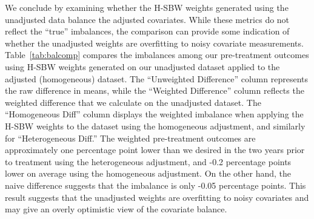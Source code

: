 We conclude by examining whether the H-SBW weights generated using the unadjusted data balance the adjusted covariates. While these metrics do not reflect the ``true'' imbalances, the comparison can provide some indication of whether the unadjusted weights are overfitting to noisy covariate measurements. Table~\ref{tab:balcomp} compares the imbalances among our pre-treatment outcomes using H-SBW weights generated on our unadjusted dataset applied to the adjusted (homogeneous) dataset. The ``Unweighted Difference'' column represents the raw difference in means, while the ``Weighted Difference'' column reflects the weighted difference that we calculate on the unadjusted dataset. The ``Homogeneous Diff'' column displays the weighted imbalance when applying the H-SBW weights to the dataset using the homogeneous adjustment, and similarly for ``Heterogeneous Diff.'' The weighted pre-treatment outcomes are approximately one percentage point lower than we desired in the two years prior to treatment using the heterogeneous adjustment, and -0.2 percentage points lower on average using the homogeneous adjustment. On the other hand, the naive difference suggests that the imbalance is only -0.05 percentage points. This result suggests that the unadjusted weights are overfitting to noisy covariates and may give an overly optimistic view of the covariate balance. 


